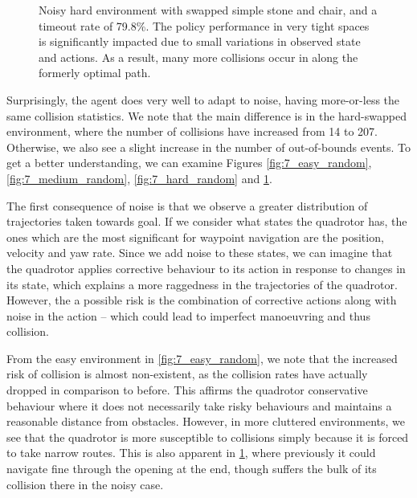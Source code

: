 \begin{figure}[htb]
    \centering
    \caption{Noisy hard environment with swapped simple stone and chair, and a timeout rate of 79.8\%. The policy performance in very tight spaces is significantly impacted due to small variations in observed state and actions. As a result, many more collisions occur in along the formerly optimal path.}
    \label{fig:7_hard_swapped_random}
\end{figure}

Surprisingly, the agent does very well to adapt to noise, having more-or-less the same collision statistics. We note that the main difference is in the hard-swapped environment, where the number of collisions have increased from 14 to 207. Otherwise, we also see a slight increase in the number of out-of-bounds events. To get a better understanding, we can examine Figures \ref{fig:7_easy_random}, \ref{fig:7_medium_random}, \ref{fig:7_hard_random} and \ref{fig:7_hard_swapped_random}.

The first consequence of noise is that we observe a greater distribution of trajectories taken towards goal. If we consider what states the quadrotor has, the ones which are the most significant for waypoint navigation are the position, velocity and yaw rate. Since we add noise to these states, we can imagine that the quadrotor applies corrective behaviour to its action in response to changes in its state, which explains a more raggedness in the trajectories of the quadrotor. However, the a possible risk is the combination of corrective actions along with noise in the action -- which could lead to imperfect manoeuvring and thus collision.  

From the easy environment in \cref{fig:7_easy_random}, we note that the increased risk of collision is almost non-existent, as the collision rates have actually dropped in comparison to before. This affirms the quadrotor conservative behaviour where it does not necessarily take risky behaviours and maintains a reasonable distance from obstacles. However, in more cluttered environments, we see that the quadrotor is more susceptible to collisions simply because it is forced to take narrow routes. This is also apparent in \cref{fig:7_hard_swapped_random}, where previously it could navigate fine through the opening at the end, though suffers the bulk of its collision there in the noisy case.


